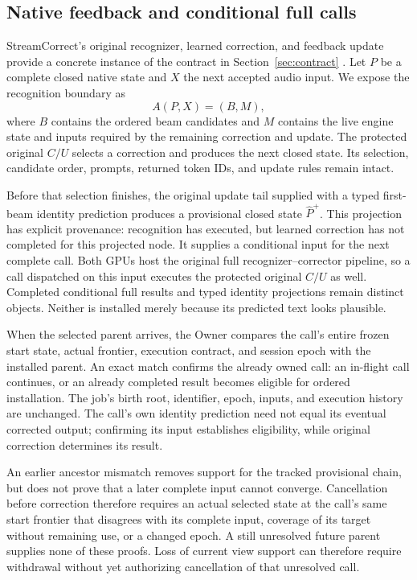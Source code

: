 \subsection{Native feedback and conditional full calls}
\label{subsec:native_full_calls}
StreamCorrect's original recognizer, learned correction, and feedback update
provide a concrete instance of the contract in Section~\ref{sec:contract}
\cite{vu2026streamcorrect}. Let $P$ be a complete closed native state and
$X$ the next accepted audio input. We expose the recognition boundary as
\begin{equation}
  A(P,X)=(B,M),
\end{equation}
where $B$ contains the ordered beam candidates and $M$ contains the live
engine state and inputs required by the remaining correction and update.
The protected original $C/U$ selects a correction and produces the next
closed state. Its selection, candidate order, prompts, returned token IDs,
and update rules remain intact.

Before that selection finishes, the original update tail supplied with a
typed first-beam identity prediction produces a provisional closed state
$\widehat P^+$. This projection has explicit provenance: recognition has
executed, but learned correction has not completed for this projected node.
It supplies a conditional input for the next complete call. Both GPUs host
the original full recognizer--corrector pipeline, so a call dispatched on
this input executes the protected original $C/U$ as well. Completed
conditional full results and typed identity projections remain distinct
objects. Neither is installed merely because its predicted text looks
plausible.

When the selected parent arrives, the Owner compares the call's entire
frozen start state, actual frontier, execution contract, and session epoch
with the installed parent. An exact match confirms the already owned call:
an in-flight call continues, or an already completed result becomes eligible
for ordered installation. The job's birth root, identifier, epoch, inputs,
and execution history are unchanged. The call's own identity prediction need
not equal its eventual corrected output; confirming its input establishes
eligibility, while original correction determines its result.

An earlier ancestor mismatch removes support for the tracked provisional
chain, but does not prove that a later complete input cannot converge.
Cancellation before correction therefore requires an actual selected state
at the call's same start frontier that disagrees with its complete input,
coverage of its target without remaining use, or a changed epoch. A still
unresolved future parent supplies none of these proofs. Loss of current
view support can therefore require withdrawal without yet authorizing
cancellation of that unresolved call.

